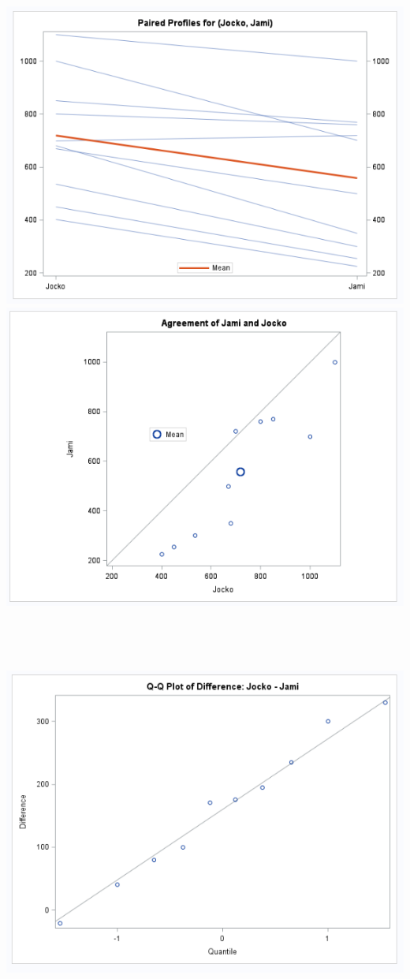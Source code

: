 \begin{center}
\includegraphics[scale=0.5]{autopaired3}\includegraphics[scale=0.6]{autopaired4}\\~\\~\\~\\~\\
\includegraphics[scale=0.6]{autopaired5}
\end{center}

